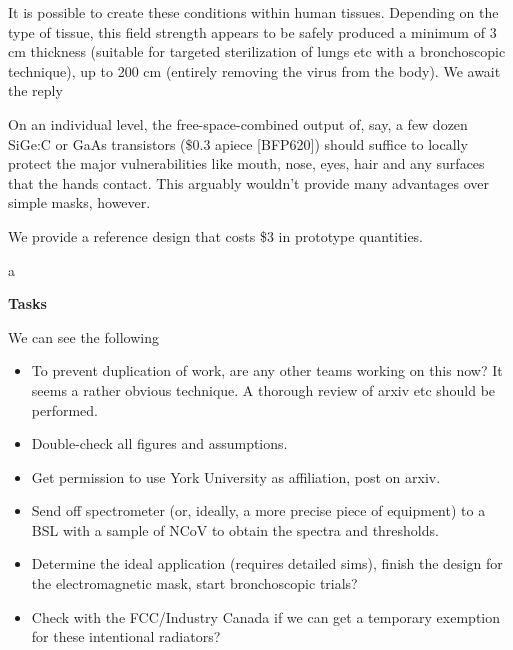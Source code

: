 \documentclass[fleqn,10pt]{paper}
\begin{document}
It is possible to create these conditions within human tissues. Depending on the type of tissue, this field strength appears to be safely produced a minimum of 3 cm thickness (suitable for targeted sterilization of lungs etc with a bronchoscopic technique), up to 200 cm (entirely removing the virus from the body).  We await the reply

On an individual level, the free-space-combined output of, say, a few dozen SiGe:C or GaAs transistors (\$0.3 apiece [BFP620]) should suffice to locally protect the major vulnerabilities like mouth, nose, eyes, hair and any surfaces that the hands contact. This arguably wouldn't provide many advantages over simple masks, however.




We provide a reference design that costs \$3 in prototype quantities.


\begin{autem}
	a
\end{autem}


{\Large \textbf{Tasks}}

We can see the following 

\begin{itemize}
	\item To prevent duplication of work, are any other teams working on this now? It seems a rather obvious technique. A thorough review of arxiv etc should be performed.
	\item Double-check all figures and assumptions.
	\item Get permission to use York University as affiliation, post on arxiv.
	\item Send off spectrometer (or, ideally, a more precise piece of equipment) to a BSL with a sample of NCoV to obtain the spectra and thresholds.
	\item Determine the ideal application (requires detailed sims), finish the design for the electromagnetic mask, start bronchoscopic trials?
			
	\item Check with the FCC/Industry Canada if we can get a temporary exemption for these intentional radiators?
	
\end{itemize}


\clearpage




\printbibliography[heading=none, title={}]
\end{document}
